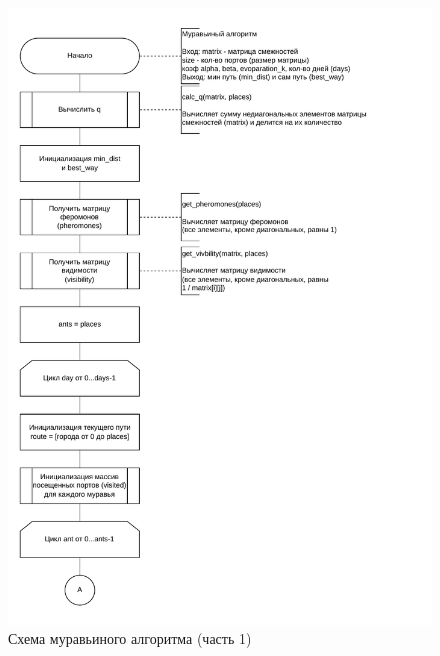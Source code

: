 \begin{figure}[h]
	\centering
	\includegraphics[height=0.9\textheight]{img/ants-1.pdf}
	\caption{Схема муравьиного алгоритма (часть 1)}
	\label{fig:ants-1}
\end{figure}

